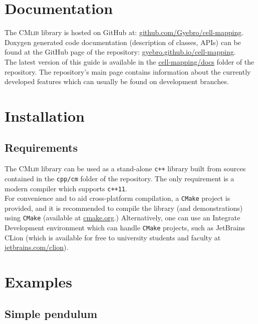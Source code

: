 \documentclass[11pt]{article}
\begin{document}
\section{Documentation}

The \textsc{CMlib} library is hosted on GitHub at: \href{https://github.com/Gyebro/cell-mapping}{github.com/Gyebro/cell-mapping}.\\
Doxygen generated code documentation (description of classes, APIs) can be found at the GitHub page of the repository: \href{https://gyebro.github.io/cell-mapping}{gyebro.github.io/cell-mapping}.\\
The latest version of this guide is available in the  \href{https://github.com/Gyebro/cell-mapping/blob/master/docs/tex/cell-mapping-cpp.pdf}{cell-mapping/docs} folder of the repository.
The repository's main page contains information about the currently developed features which can usually be found on development branches.

\section{Installation}

\subsection{Requirements}

The \textsc{CMlib} library can be used as a stand-alone \texttt{c++} library built from sources contained in the \texttt{cpp/cm} folder of the repository. The only requirement is a modern compiler which supports \texttt{c++11}.\\

For convenience and to aid cross-platform compilation, a \texttt{CMake} project is provided, and it is recommended to compile the library (and demonstrations) using \texttt{CMake} (available at \href{https://cmake.org/}{cmake.org}.) 
Alternatively, one can use an Integrate Development environment which can handle \texttt{CMake} projects, such as JetBrains CLion (which is available for free to university students and faculty at \href{https://www.jetbrains.com/clion/}{jetbrains.com/clion}).


\section{Examples}

\subsection{Simple pendulum}
\end{document}
